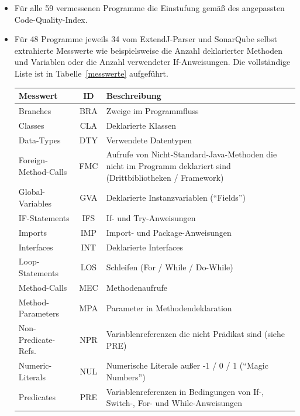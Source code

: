 \documentclass[da,ngerman]{stthesis}
\begin{document}
  			\begin{itemize}
  				\item Für alle 59 vermessenen Programme die Einstufung gemäß des angepassten Code-Quality-Index.
  				\item Für 48 Programme jeweils 34 vom ExtendJ-Parser und SonarQube selbst extrahierte Messwerte wie beispielsweise die Anzahl deklarierter Methoden und Variablen oder die Anzahl verwendeter If-Anweisungen. Die vollständige Liste ist in Tabelle~\ref{messwerte} aufgeführt.
  				\begin{center}
					\tabulinesep=1.5mm
					\begin{longtabu}{|p{0.23\textwidth}|c|p{0.63\textwidth}|}
						\hline
  						\textbf{Messwert} & \textbf{ID} & \textbf{Beschreibung} \\
  						\hline
    					Branches & BRA & Zweige im Programmfluss\\
    					\hline
    					Classes & CLA & Deklarierte Klassen\\
    					\hline
    					Data-Types & DTY & Verwendete Datentypen\\
    					\hline
    					Foreign-Method-Calls & FMC & Aufrufe von Nicht-Standard-Java-Methoden die nicht im Programm deklariert sind (Drittbibliotheken / Framework)\\
    					\hline
    					Global-Variables & GVA & Deklarierte Instanzvariablen ("`Fields"')\\
    					\hline
    					IF-Statements & IFS & If- und Try-Anweisungen\\
    					\hline
    					Imports & IMP & Import- und Package-Anweisungen\\
    					\hline
    					Interfaces & INT & Deklarierte Interfaces\\
    					\hline
    					Loop-Statements & LOS & Schleifen (For / While / Do-While)\\
    					\hline
    					Method-Calls & MEC & Methodenaufrufe\\
    					\hline
    					Method-Parameters & MPA & Parameter in Methodendeklaration\\
    					\hline
    					Non-Predicate-Refs. & NPR & Variablenreferenzen die nicht Prädikat sind (siehe PRE)\\
    					\hline
    					Numeric-Literals & NUL & Numerische Literale außer -1 / 0 / 1 ("`Magic Numbers"')\\
    					\hline
    					Predicates & PRE & Variablenreferenzen in Bedingungen von If-, Switch-, For- und While-Anweisungen\\

\end{longtabu}
\end{center}
\end{itemize}
\end{document}
